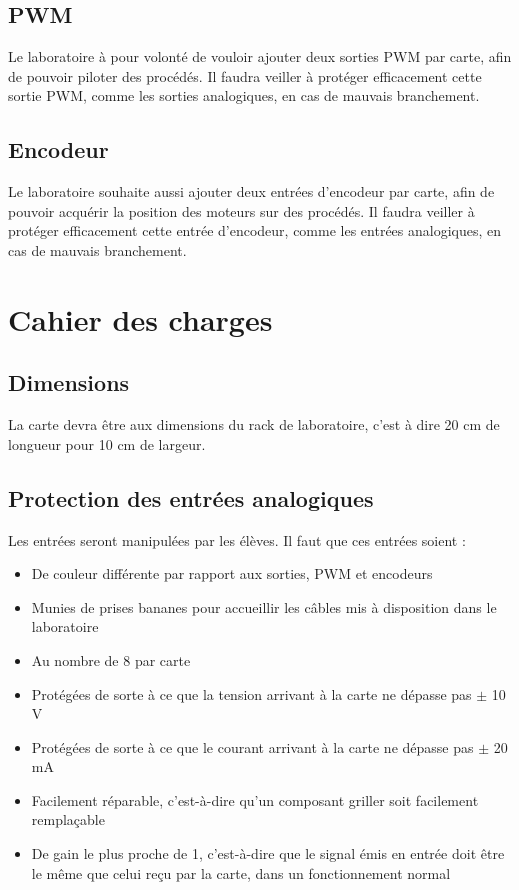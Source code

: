 \documentclass{report}
\begin{document}
\subsection{PWM}
Le laboratoire à pour volonté de vouloir ajouter deux sorties PWM par carte, afin de pouvoir piloter des procédés. Il faudra veiller à protéger efficacement cette sortie PWM, comme les sorties analogiques, en cas de mauvais branchement.

\subsection{Encodeur}
Le laboratoire souhaite aussi ajouter deux entrées d'encodeur par carte, afin de pouvoir acquérir la position des moteurs sur des procédés. Il faudra veiller à protéger efficacement cette entrée d'encodeur, comme les entrées analogiques, en cas de mauvais branchement.

\section{Cahier des charges}
\subsection{Dimensions}
La carte devra être aux dimensions du rack de laboratoire, c'est à dire 20 cm de longueur pour 10 cm de largeur. 

\subsection{Protection des entrées analogiques}
Les entrées seront manipulées par les élèves. Il faut que ces entrées soient :
\begin{itemize}
\item De couleur différente par rapport aux sorties, PWM et encodeurs
\item Munies de prises bananes pour accueillir les câbles mis à disposition dans le laboratoire
\item Au nombre de 8 par carte
\item Protégées de sorte à ce que la tension arrivant à la carte ne dépasse pas $\pm$ 10 V
\item Protégées de sorte à ce que le courant arrivant à la carte ne dépasse pas $\pm$ 20 mA
\item Facilement réparable, c'est-à-dire qu'un composant griller soit facilement remplaçable
\item De gain le plus proche de 1, c'est-à-dire que le signal émis en entrée doit être le même que celui reçu par la carte, dans un fonctionnement normal
\end{itemize}
\end{document}
